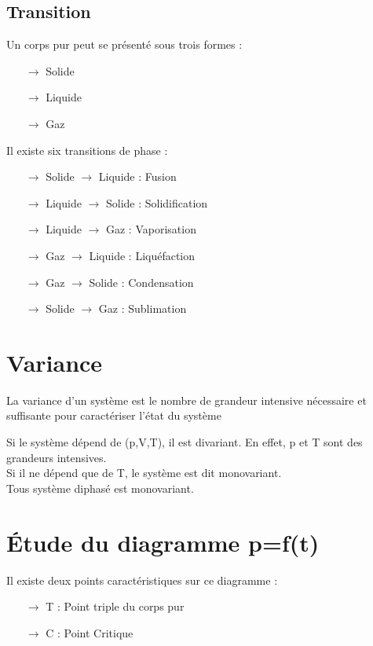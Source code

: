 \subsection{Transition}
Un corps pur peut se présenté sous trois formes :
\begin{itemize}
 \item[$\rightarrow$]Solide
 \item[$\rightarrow$]Liquide
 \item[$\rightarrow$]Gaz
\end{itemize}
Il existe six transitions de phase :
\begin{itemize}
 \item[$\rightarrow$]Solide $\rightarrow$ Liquide : Fusion
 \item[$\rightarrow$]Liquide $\rightarrow$ Solide : Solidification
 \item[$\rightarrow$]Liquide $\rightarrow$ Gaz : Vaporisation
 \item[$\rightarrow$]Gaz $\rightarrow$ Liquide : Liquéfaction
 \item[$\rightarrow$]Gaz $\rightarrow$ Solide : Condensation
 \item[$\rightarrow$]Solide $\rightarrow$ Gaz : Sublimation
\end{itemize}
\section{Variance}
\begin{de}
 La variance d'un système est le nombre de grandeur intensive nécessaire et suffisante pour caractériser l'état du système
\end{de}
Si le système dépend de (p,V,T), il est divariant. En effet, p et T sont des grandeurs intensives.\\
Si il ne dépend que de T, le système est dit monovariant.\\
Tous système diphasé est monovariant.
\section{Étude du diagramme p=f(t)}
Il existe deux points caractéristiques sur ce diagramme :
\begin{itemize}
 \item[$\rightarrow$] T : Point triple du corps pur
 \item[$\rightarrow$] C : Point Critique
\end{itemize}
